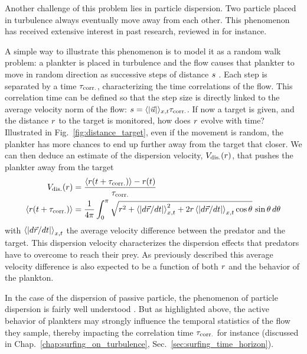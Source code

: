 Another challenge of this problem lies in particle dispersion.
Two particle placed in turbulence always eventually move away from each other.
This phenomenon has received extensive interest in past research, reviewed in \citet{salazar2009two} for instance.

A simple way to illustrate this phenomenon is to model it as a random walk problem:
a plankter is placed in turbulence and the flow causes that plankter to move in random direction as successive steps of distance $s$ .
Each step is separated by a time $\tau_{\mathrm{corr.}}$, characterizing the time correlations of the flow.
This correlation time can be defined so that the step size is directly linked to the average velocity norm of the flow: $s = \langle \lvert\vec{u}\rvert \rangle_{x, t} \tau_{\mathrm{corr.}}$.
If now a target is given, and the distance $r$ to the target is monitored, how does $r$ evolve with time?
Illustrated in Fig.~\ref{fig:distance_target}, even if the movement is random, the plankter has more chances to end up further away from the target that closer.
We can then deduce an estimate of the dispersion velocity, $V_{\mathrm{dis.}}(r)$, that pushes the plankter away from the target
\begin{subequations}
	\begin{align}
		V_{\mathrm{dis.}}(r) &= \frac{\left\langle r(t + \tau_{\mathrm{corr.}}) \right\rangle - r(t)}{\tau_{\mathrm{corr.}}} \\
		\left\langle r(t + \tau_{\mathrm{corr.}}) \right\rangle &= \frac{1}{4\pi} \int_0^\pi \sqrt{r^2 + \left\langle \lvert d \vec{r} / dt\rvert \right\rangle_{x,t}^2 + 2 r \left\langle \lvert d \vec{r} / dt\rvert \right\rangle_{x,t} \cos \theta } \, \sin \theta  \, d\theta
	\end{align}
\end{subequations}
with $\left\langle \lvert d \vec{r} / dt\rvert \right\rangle_{x,t}$ the average velocity difference between the predator and the target.
This dispersion velocity characterizes the dispersion effects that predators have to overcome to reach their prey.
As previously described this average velocity difference is also expected to be a function of both $r$ and the behavior of the plankton.

In the case of the dispersion of passive particle, the phenomenon of particle dispersion is fairly well understood \citep{salazar2009two}.
But as highlighted above, the active behavior of plankters may strongly influence the temporal statistics of the flow they sample, thereby impacting the correlation time $\tau_{\mathrm{corr.}}$ for instance (discussed in Chap.~\ref{chap:surfing_on_turbulence}, Sec.~\ref{sec:surfing_time_horizon}).

